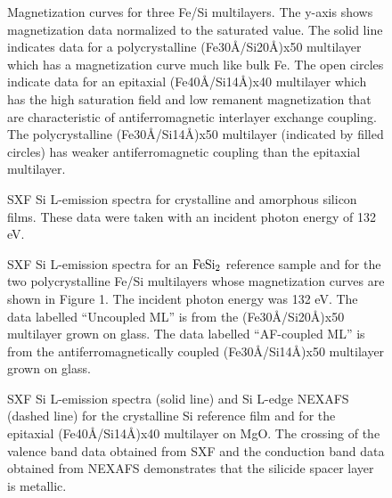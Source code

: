 \clearpage

\begin{figure}
\caption{Magnetization curves for three Fe/Si
multilayers.  The y-axis shows magnetization data normalized to the
saturated value.  The solid line indicates data for a polycrystalline
(Fe30\AA/Si20\AA)x50 multilayer which has a magnetization curve much
like bulk Fe.  The open circles indicate data for an epitaxial
(Fe40\AA/Si14\AA)x40 multilayer which has the high saturation field
and low remanent magnetization that are characteristic of
antiferromagnetic interlayer exchange coupling.  The polycrystalline
(Fe30\AA/Si14\AA)x50 multilayer (indicated by filled circles) has
weaker antiferromagnetic coupling than the epitaxial multilayer.}
\label{magcurves}
\end{figure}

\begin{figure}
\caption{SXF Si L-emission spectra for crystalline and amorphous silicon
films.  These data were taken with an incident photon energy of 132
eV.}
\label{refspect}
\end{figure}

\begin{figure}
\caption{SXF Si L-emission spectra for an $\rm FeSi_2$ reference
sample and for the two polycrystalline Fe/Si multilayers whose
magnetization curves are shown in Figure 1.  The incident photon
energy was 132 eV.  The data labelled ``Uncoupled ML'' is from the
(Fe30\AA/Si20\AA)x50 multilayer grown on glass.  The data labelled
``AF-coupled ML'' is from the antiferromagnetically coupled
(Fe30\AA/Si14\AA)x50 multilayer grown on glass.}
\label{allxrf}
\end{figure}


\begin{figure}
\caption{SXF Si L-emission spectra (solid line) and Si L-edge NEXAFS
(dashed line) for the crystalline Si reference film and for the
epitaxial (Fe40\AA/Si14\AA)x40 multilayer on MgO.  The crossing of the
valence band data obtained from SXF and the conduction band data
obtained from NEXAFS demonstrates that the silicide spacer layer is
metallic.}
\label{nexafs}
\end{figure}



